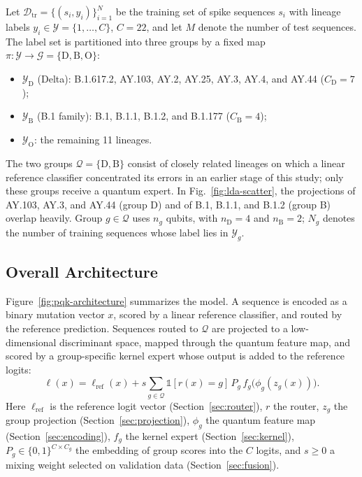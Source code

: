 \documentclass[conference]{IEEEtran}
\begin{document}
Let $\mathcal{D}_{\mathrm{tr}}=\{(s_i,y_i)\}_{i=1}^{N}$ be the training set of spike sequences $s_i$ with lineage labels $y_i\in\mathcal{Y}=\{1,\dots,C\}$, $C=22$, and let $M$ denote the number of test sequences. The label set is partitioned into three groups by a fixed map $\pi:\mathcal{Y}\to\mathcal{G}=\{\mathrm{D},\mathrm{B},\mathrm{O}\}$:
\begin{itemize}
    \item $\mathcal{Y}_{\mathrm{D}}$ (Delta): B.1.617.2, AY.103, AY.2, AY.25, AY.3, AY.4, and AY.44 ($C_{\mathrm{D}}=7$);
    \item $\mathcal{Y}_{\mathrm{B}}$ (B.1 family): B.1, B.1.1, B.1.2, and B.1.177 ($C_{\mathrm{B}}=4$);
    \item $\mathcal{Y}_{\mathrm{O}}$: the remaining 11 lineages.
\end{itemize}
The two groups $\mathcal{Q}=\{\mathrm{D},\mathrm{B}\}$ consist of closely related lineages on which a linear reference classifier concentrated its errors in an earlier stage of this study; only these groups receive a quantum expert. In Fig.~\ref{fig:lda-scatter}, the projections of AY.103, AY.3, and AY.44 (group D) and of B.1, B.1.1, and B.1.2 (group B) overlap heavily. Group $g\in\mathcal{Q}$ uses $n_g$ qubits, with $n_{\mathrm{D}}=4$ and $n_{\mathrm{B}}=2$; $N_g$ denotes the number of training sequences whose label lies in $\mathcal{Y}_g$.

\subsection{Overall Architecture}
\label{sec:architecture}

Figure~\ref{fig:pqk-architecture} summarizes the model. A sequence is encoded as a binary mutation vector $x$, scored by a linear reference classifier, and routed by the reference prediction. Sequences routed to $\mathcal{Q}$ are projected to a low-dimensional discriminant space, mapped through the quantum feature map, and scored by a group-specific kernel expert whose output is added to the reference logits:
\begin{equation}
    \ell(x)=\ell_{\mathrm{ref}}(x)
    +s\sum_{g\in\mathcal{Q}}\mathbb{1}[r(x)=g]\,P_g\,f_g\!\big(\phi_g(z_g(x))\big).
    \label{eq:master}
\end{equation}
Here $\ell_{\mathrm{ref}}$ is the reference logit vector (Section~\ref{sec:router}), $r$ the router, $z_g$ the group projection (Section~\ref{sec:projection}), $\phi_g$ the quantum feature map (Section~\ref{sec:encoding}), $f_g$ the kernel expert (Section~\ref{sec:kernel}), $P_g\in\{0,1\}^{C\times C_g}$ the embedding of group scores into the $C$ logits, and $s\ge 0$ a mixing weight selected on validation data (Section~\ref{sec:fusion}).
\end{document}
